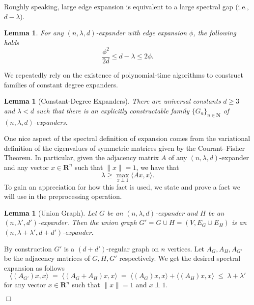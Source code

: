 \documentclass{article}
\newtheorem{lemma}[theorem]{Lemma}
\newenvironment{proof}{\noindent{\bf Proof:} \hspace*{1mm}}{
	\hspace*{\fill} $\Box$ }
\newcommand{\N}{{\mathbf N}}
\newcommand{\R}{{\mathbf R}}
\begin{document}
Roughly speaking, large edge expansion is equivalent to a large spectral gap (i.e., $d - \lambda$).

\begin{lemma}%
For any $(n, \lambda, d)$-expander with edge expansion $\phi$, the following holds
$$
\frac{\phi^2}{2d} \le d - \lambda \le 2\phi.
$$
\end{lemma}

We repeatedly rely on the existence of polynomial-time algorithms
to construct families of constant degree expanders.

\begin{lemma}[Constant-Degree Expanders]\label{expandersexist}
There are universal constants $d \ge 3$ and $\lambda < d$ such that there
is an explicitly constructable %
family $\{G_n\}_{n\in \N}$ of $(n, \lambda, d)$-expanders.%
\end{lemma}

One nice aspect of the spectral definition of
expansion comes from the variational definition of the eigenvalues
of symmetric matrices given by the Courant--Fisher Theorem.
In particular, given the adjacency matrix $A$ of any $(n, \lambda, d)$-expander
and any vector $x \in \R^n$ such that $\|x\| = 1$, we have that
$$
\lambda \ge \max_{x \perp 1} \langle Ax, x\rangle. %
$$
To gain an appreciation for how this fact is used, we state and prove a
fact we will use in the preprocessing operation.

\begin{lemma}[Union Graph]\label{union}
Let $G$ be an $(n, \lambda, d)$-expander and $H$ be an $(n, \lambda', d')$-expander.
Then the \emph{union graph} $G' = G \cup H = (V, E_G \cup E_H)$ is an
$(n, \lambda + \lambda', d+d')$-expander.
\end{lemma}

\begin{proof}
By construction $G'$ is a $(d+d')$-regular graph on $n$ vertices.
Let $A_G, A_H, A_{G'}$ be the adjacency matrices of $G, H, G'$ respectively.
We get the desired spectral expansion
as follows
$$
\langle (A_{G'})x, x\rangle
  \;=\; \langle (A_G+A_H)x, x\rangle
  \;=\; \langle (A_G)x, x\rangle + \langle (A_H)x, x\rangle
  \;\le\; \lambda + \lambda'
$$
for any vector $x \in \R^n$ such that $\|x\| = 1$ and $x \perp 1$.
\end{proof}\\
\end{document}
